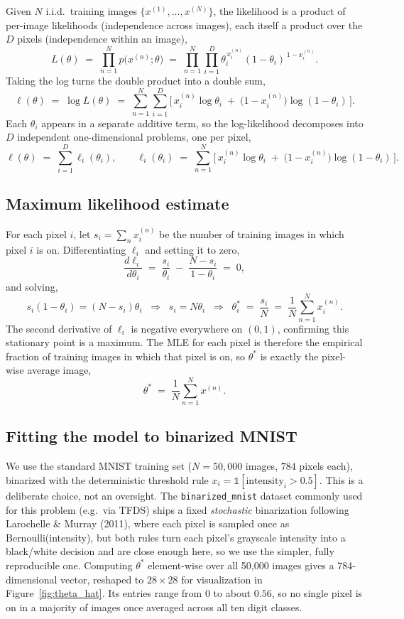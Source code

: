 \documentclass[11pt]{article}
\begin{document}
Given $N$ i.i.d.\ training images $\{x^{(1)}, \dots, x^{(N)}\}$, the likelihood
is a product of per-image likelihoods (independence across images), each itself
a product over the $D$ pixels (independence within an image),
\[
  L(\theta) \;=\; \prod_{n=1}^{N} p\big(x^{(n)}; \theta\big)
  \;=\; \prod_{n=1}^{N} \prod_{i=1}^{D}
  \theta_i^{\,x_i^{(n)}} (1-\theta_i)^{\,1-x_i^{(n)}}.
\]
Taking the log turns the double product into a double sum,
\[
  \ell(\theta) \;=\; \log L(\theta)
  \;=\; \sum_{n=1}^{N} \sum_{i=1}^{D}
  \Big[\, x_i^{(n)} \log \theta_i \;+\; \big(1-x_i^{(n)}\big) \log(1-\theta_i) \,\Big].
\]
Each $\theta_i$ appears in a separate additive term, so the log-likelihood
decomposes into $D$ independent one-dimensional problems, one per pixel,
\[
  \ell(\theta) \;=\; \sum_{i=1}^{D} \ell_i(\theta_i),
  \qquad
  \ell_i(\theta_i) \;=\; \sum_{n=1}^{N}
  \Big[\, x_i^{(n)} \log \theta_i \;+\; \big(1-x_i^{(n)}\big) \log(1-\theta_i) \,\Big].
\]

\subsection*{Maximum likelihood estimate}

For each pixel $i$, let $s_i = \sum_{n} x_i^{(n)}$ be the number of training
images in which pixel $i$ is on. Differentiating $\ell_i$ and setting it to
zero,
\[
  \frac{d\ell_i}{d\theta_i} \;=\; \frac{s_i}{\theta_i} \;-\; \frac{N-s_i}{1-\theta_i} \;=\; 0,
\]
and solving,
\[
  s_i(1-\theta_i) = (N-s_i)\theta_i
  \;\;\Longrightarrow\;\;
  s_i = N\theta_i
  \;\;\Longrightarrow\;\;
  \theta_i^{*} \;=\; \frac{s_i}{N} \;=\; \frac{1}{N}\sum_{n=1}^{N} x_i^{(n)}.
\]
The second derivative of $\ell_i$ is negative everywhere on $(0,1)$, confirming
this stationary point is a maximum. The MLE for each pixel is therefore the
empirical fraction of training images in which that pixel is on, so $\theta^{*}$
is exactly the pixel-wise average image,
\[
  \theta^{*} \;=\; \frac{1}{N}\sum_{n=1}^{N} x^{(n)}.
\]

\subsection*{Fitting the model to binarized MNIST}

We use the standard MNIST training set ($N = 50{,}000$ images, $784$ pixels
each), binarized with the deterministic threshold rule
$x_i = \mathbb{1}[\text{intensity}_i > 0.5]$. This is a deliberate choice, not
an oversight. The \texttt{binarized\_mnist} dataset commonly used for this
problem (e.g.\ via TFDS) ships a fixed \emph{stochastic} binarization following
Larochelle \& Murray (2011), where each pixel is sampled once as
Bernoulli(intensity), but both rules turn each pixel's grayscale intensity into
a black/white decision and are close enough here, so we use the simpler, fully
reproducible one. Computing $\theta^{*}$ element-wise over all 50{,}000 images
gives a 784-dimensional vector, reshaped to $28\times 28$ for visualization in
Figure~\ref{fig:theta_hat}. Its entries range from $0$ to about $0.56$, so no
single pixel is on in a majority of images once averaged across all ten digit
classes.
\end{document}
